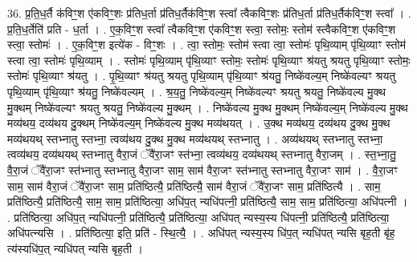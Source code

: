 \documentclass[17pt]{extarticle}
\begin{document}
36. प्र॒ति॒ध॒र्तै क॑विꣳ॒॒श ए॑कविꣳ॒॒शः प्र॑तिध॒र्ता प्र॑तिध॒र्तैक॑विꣳ॒॒श स्त्वा᳚ त्वैकविꣳ॒॒शः प्र॑तिध॒र्ता प्र॑तिध॒र्तैक॑विꣳ॒॒श स्त्वा᳚ । . प्र॒ति॒ध॒र्तेति॑ प्रति - ध॒र्ता । . ए॒क॒विꣳ॒॒श स्त्वा᳚ त्वैकविꣳ॒॒श ए॑कविꣳ॒॒श स्त्वा॒ स्तोमः॒ स्तोम॑ स्त्वैकविꣳ॒॒श ए॑कविꣳ॒॒श स्त्वा॒ स्तोमः॑ । . ए॒क॒विꣳ॒॒श इत्ये॑क - विꣳ॒॒शः । . त्वा॒ स्तोमः॒ स्तोम॑ स्त्वा त्वा॒ स्तोमः॑ पृथि॒व्याम् पृ॑थि॒व्याꣳ स्तोम॑ स्त्वा त्वा॒ स्तोमः॑ पृथि॒व्याम् । . स्तोमः॑ पृथि॒व्याम् पृ॑थि॒व्याꣳ स्तोमः॒ स्तोमः॑ पृथि॒व्याꣳ श्र॑यतु श्रयतु पृथि॒व्याꣳ स्तोमः॒ स्तोमः॑ पृथि॒व्याꣳ श्र॑यतु । . पृ॒थि॒व्याꣳ श्र॑यतु श्रयतु पृथि॒व्याम् पृ॑थि॒व्याꣳ श्र॑यतु॒ निष्के॑वल्य॒म् निष्के॑वल्यꣳ श्रयतु पृथि॒व्याम् पृ॑थि॒व्याꣳ श्र॑यतु॒ निष्के॑वल्यम् । . श्र॒य॒तु॒ निष्के॑वल्य॒म् निष्के॑वल्यꣳ श्रयतु श्रयतु॒ निष्के॑वल्य मु॒क्थ मु॒क्थम् निष्के॑वल्यꣳ श्रयतु श्रयतु॒ निष्के॑वल्य मु॒क्थम् । . निष्के॑वल्य मु॒क्थ मु॒क्थम् निष्के॑वल्य॒म् निष्के॑वल्य मु॒क्थ मव्य॑थय॒ दव्य॑थय दु॒क्थम् निष्के॑वल्य॒म् निष्के॑वल्य मु॒क्थ मव्य॑थयत् । . उ॒क्थ मव्य॑थय॒ दव्य॑थय दु॒क्थ मु॒क्थ मव्य॑थयथ् स्तभ्नातु स्तभ्ना॒ त्वव्य॑थय दु॒क्थ मु॒क्थ मव्य॑थयथ् स्तभ्नातु । . अव्य॑थयथ् स्तभ्नातु स्तभ्ना॒ त्वव्य॑थय॒ दव्य॑थयथ् स्तभ्नातु वैरा॒जं ॅवै॑रा॒जꣳ स्त॑भ्ना॒ त्वव्य॑थय॒ दव्य॑थयथ् स्तभ्नातु वैरा॒जम् । . स्त॒भ्ना॒तु॒ वै॒रा॒जं ॅवै॑रा॒जꣳ स्त॑भ्नातु स्तभ्नातु वैरा॒जꣳ साम॒ साम॑ वैरा॒जꣳ स्त॑भ्नातु स्तभ्नातु वैरा॒जꣳ साम॑ । . वै॒रा॒जꣳ साम॒ साम॑ वैरा॒जं ॅवै॑रा॒जꣳ साम॒ प्रति॑ष्ठित्यै॒ प्रति॑ष्ठित्यै॒ साम॑ वैरा॒जं ॅवै॑रा॒जꣳ साम॒ प्रति॑ष्ठित्यै । . साम॒ प्रति॑ष्ठित्यै॒ प्रति॑ष्ठित्यै॒ साम॒ साम॒ प्रति॑ष्ठित्या॒ अधि॑प॒त् न्यधि॑पत्नी॒ प्रति॑ष्ठित्यै॒ साम॒ साम॒ प्रति॑ष्ठित्या॒ अधि॑पत्नी । . प्रति॑ष्ठित्या॒ अधि॑प॒त् न्यधि॑पत्नी॒ प्रति॑ष्ठित्यै॒ प्रति॑ष्ठित्या॒ अधि॑पत् न्यस्य॒स्य धि॑पत्नी॒ प्रति॑ष्ठित्यै॒ प्रति॑ष्ठित्या॒ अधि॑पत्न्यसि । . प्रति॑ष्ठित्या॒ इति॒ प्रति॑ - स्थि॒त्यै॒ । . अधि॑पत् न्यस्य॒स्य धि॑प॒त् न्यधि॑पत् न्यसि बृह॒ती बृ॑ह॒ त्य॑स्यधि॑प॒त् न्यधि॑पत् न्यसि बृह॒ती । \newline
\end{document}
